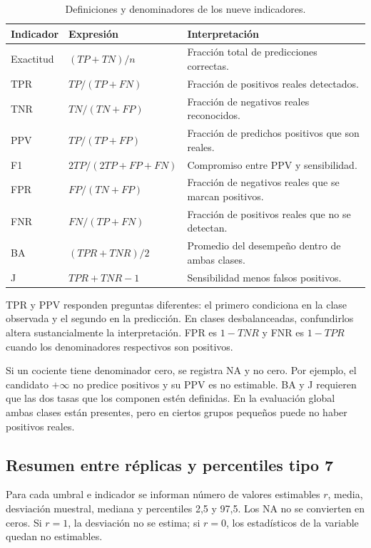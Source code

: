\documentclass[11pt,a4paper]{article}
\newcommand{\NA}{\mathrm{NA}}
\begin{document}
\begin{table}[H]\centering\small
\caption{Definiciones y denominadores de los nueve indicadores.}\label{tab:formulas}
\begin{tabularx}{\linewidth}{l l X}\toprule
Indicador & Expresión & Interpretación \\\midrule
Exactitud & $(TP+TN)/n$ & Fracción total de predicciones correctas.\\
TPR & $TP/(TP+FN)$ & Fracción de positivos reales detectados.\\
TNR & $TN/(TN+FP)$ & Fracción de negativos reales reconocidos.\\
PPV & $TP/(TP+FP)$ & Fracción de predichos positivos que son reales.\\
F1 & $2TP/(2TP+FP+FN)$ & Compromiso entre PPV y sensibilidad.\\
FPR & $FP/(TN+FP)$ & Fracción de negativos reales que se marcan positivos.\\
FNR & $FN/(TP+FN)$ & Fracción de positivos reales que no se detectan.\\
BA & $(TPR+TNR)/2$ & Promedio del desempeño dentro de ambas clases.\\
J & $TPR+TNR-1$ & Sensibilidad menos falsos positivos.\\\bottomrule
\end{tabularx}\end{table}

TPR y PPV responden preguntas diferentes: el primero condiciona en la clase observada y el segundo en la predicción. En clases desbalanceadas, confundirlos altera sustancialmente la interpretación. FPR es $1-TNR$ y FNR es $1-TPR$ cuando los denominadores respectivos son positivos.

Si un cociente tiene denominador cero, se registra $\NA$ y no cero. Por ejemplo, el candidato $+\infty$ no predice positivos y su PPV es no estimable. BA y J requieren que las dos tasas que los componen estén definidas. En la evaluación global ambas clases están presentes, pero en ciertos grupos pequeños puede no haber positivos reales.

\subsection{Resumen entre réplicas y percentiles tipo 7}
Para cada umbral e indicador se informan número de valores estimables $r$, media, desviación muestral, mediana y percentiles 2,5 y 97,5. Los $\NA$ no se convierten en ceros. Si $r=1$, la desviación no se estima; si $r=0$, los estadísticos de la variable quedan no estimables.
\end{document}
